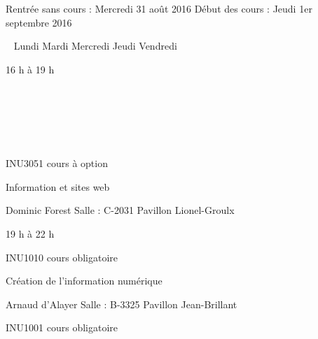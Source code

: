 \documentclass [12 pt]{article}
\begin{document}
            Rentrée sans cours : Mercredi 31 août 2016
            Début des cours : Jeudi 1er septembre 2016
            
                
                    
                        
                             
                            Lundi
                            Mardi
                            Mercredi
                            Jeudi
                            Vendredi
                        
                        
                            16 h à 19 h
                             
                            
                                 
                            
                             
                            
                                 
                            
                            
                                
                                    INU3051 cours à option
                                
                                
                                    Information et sites web
                                
                                Dominic Forest
                                Salle : C-2031
                                Pavillon Lionel-Groulx
                            
                        
                        
                            19 h à 22 h
                            
                                
                                    INU1010 cours obligatoire
                                
                                
                                    Création de l'information numérique
                                
                                Arnaud d'Alayer
                                Salle : B-3325
                                Pavillon Jean-Brillant
                            
                            
                                
                                    INU1001 cours obligatoire
                                
\end{document}
